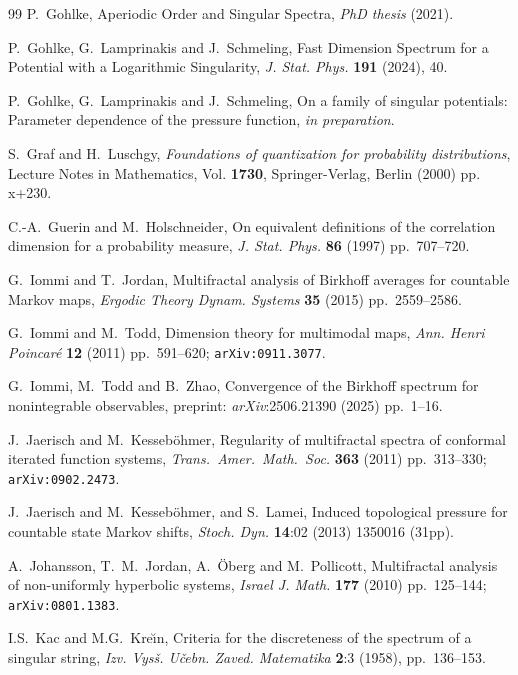 \documentclass[11pt,reqno]{amsart}
\theoremstyle{plain}
\theoremstyle{definition}
\begin{document}
\begin{thebibliography}{99}
P.~Gohlke,
Aperiodic Order and Singular Spectra,
\textit{PhD thesis} (2021).

P.~Gohlke, G.~Lamprinakis and J.~Schmeling,
Fast Dimension Spectrum for a Potential with a Logarithmic Singularity,
\textit{J. Stat. Phys.} \textbf{191} (2024), 40.

P.~Gohlke, G.~Lamprinakis and J.~Schmeling,
On a family of singular potentials: Parameter dependence of the pressure function,
\textit{in preparation}.
 
S.~Graf and H.~Luschgy,
\textit{Foundations of quantization for probability distributions},
Lecture Notes in Mathematics, Vol. \textbf{1730}, {Springer-Verlag, Berlin} (2000) 
pp. {x+230}.

C.-A.~Guerin and M.~Holschneider,
On equivalent definitions of the correlation dimension for a probability measure,
\textit{J. Stat. Phys.} 
\textbf{86} (1997) pp.~707--720. 

G.~Iommi and T.~Jordan, 
Multifractal analysis of Birkhoff averages for countable Markov maps,
\textit{Ergodic Theory Dynam. Systems} \textbf{35} (2015) pp.~2559--2586.

G.~Iommi and M.~Todd, 
Dimension theory for multimodal maps, 
\textit{Ann. Henri Poincar\'{e}} \textbf{12} (2011) pp.~591--620;
\texttt{arXiv:0911.3077}.

G.~Iommi, M.~Todd and B.~Zhao,
Convergence of the Birkhoff spectrum for nonintegrable observables, 
  preprint:  \textit{arXiv}:2506.21390  (2025) pp.~1--16.

 
J.~Jaerisch and M.~Kesseb{\"o}hmer,
Regularity of multifractal spectra of conformal iterated
function systems, \textit{Trans.\ Amer.\ Math.\ Soc.}
\textbf{363} (2011) pp.~313--330; 
\texttt{arXiv:0902.2473}.

J.~Jaerisch and M.~Kesseb{\"o}hmer, and S.~Lamei, 
Induced topological pressure for countable state {M}arkov shifts,
\textit{Stoch. Dyn.} \textbf{14}:02 (2013) 1350016 (31pp).
 

A.~Johansson, T.~M.~Jordan, A.~\"{O}berg and M.~Pollicott, 
Multifractal analysis of non-uniformly hyperbolic systems,
\textit{Israel J. Math.} \textbf{177} (2010) pp.~125--144;
\texttt{arXiv:0801.1383}. 


I.S.~Kac and M.G.~Kre\u{\i}n,
Criteria for the discreteness of the spectrum of a singular string,
\textit{Izv. Vys\v{s}. U\v{c}ebn. Zaved. Matematika}
\textbf{2}:3 (1958), pp.~136--153.




\end{thebibliography}
\end{document}
